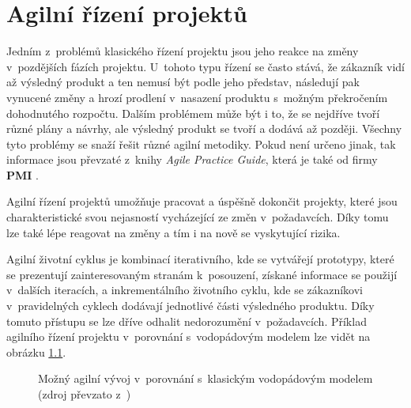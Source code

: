 \chapter{Agilní řízení projektů}
\label{agilni}

Jedním z~problémů klasického řízení projektu jsou jeho reakce na změny v~pozdějších fázích projektu. U~tohoto typu řízení se často stává, že zákazník vidí až výsledný produkt a ten nemusí být podle jeho představ, následují pak vynucené změny a hrozí prodlení v~nasazení produktu s~možným překročením dohodnutého rozpočtu. Dalším problémem může být i to, že se nejdříve tvoří různé plány a návrhy, ale výsledný produkt se tvoří a dodává až později. Všechny tyto problémy se snaží řešit různé agilní metodiky. Pokud není určeno jinak, tak informace jsou převzaté z~knihy \textit{Agile Practice Guide}, která je také od firmy \textbf{PMI} \cite{PMBOKAgile}.

Agilní řízení projektů umožňuje pracovat a úspěšně dokončit projekty, které jsou charakteristické svou nejasností vycházející ze změn v~požadavcích. Díky tomu lze také lépe reagovat na změny a tím i na nově se vyskytující rizika.

Agilní životní cyklus je kombinací iterativního, kde se vytvářejí prototypy, které se prezentují zainteresovaným stranám k~posouzení, získané informace se použijí v~dalších iteracích, a inkrementálního životního cyklu, kde se zákazníkovi v~pravidelných cyklech dodávají jednotlivé části výsledného produktu. Díky tomuto přístupu se lze dříve odhalit nedorozumění v~požadavcích.  Příklad agilního řízení projektu v~porovnání s~vodopádovým modelem lze vidět na obrázku \ref{agilniVyvoj}.

    \begin{figure}[ht]
    \begin{center}
    \caption{Možný agilní vývoj v~porovnání s~klasickým vodopádovým modelem (zdroj převzato z~\cite{agileObraz})}
    \label{agilniVyvoj}
    \end{center}
    \end{figure}

